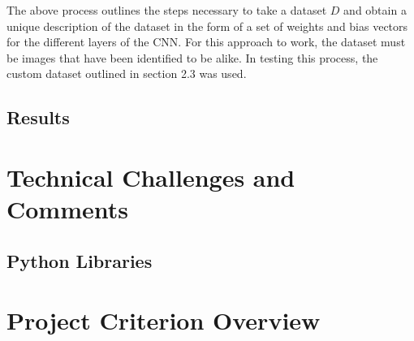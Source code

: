 \documentclass{article}
\begin{document}
The above process outlines the steps necessary to take a dataset $D$ and obtain a unique description of the dataset in the
form of a set of weights and bias vectors for the different layers of the CNN. For this approach to work, the dataset must be
images that have been identified to be alike. In testing this process, the custom dataset outlined in section 2.3 was used.
  
\subsection{Results}

\section{Technical Challenges and Comments}
\subsection{Python Libraries}

\section{Project Criterion Overview}
\end{document}
